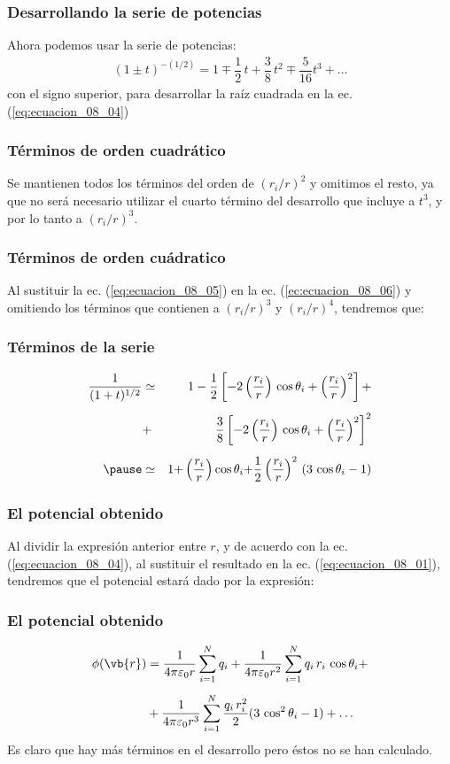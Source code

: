 \begin{frame}
\frametitle{Desarrollando la serie de potencias}
Ahora podemos usar la serie de potencias:
\begin{align}
(1 \pm t)^{-(1/2)} = 1 \mp \dfrac{1}{2} \, t + \dfrac{3}{8} \, t^{2} \mp \dfrac{5}{16} t^{3} + \ldots
\label{ec:ecuacion_08_06}
\end{align}
con el signo superior, para desarrollar la raíz cuadrada en la ec. (\ref{eq:ecuacion_08_04})
\end{frame}
\begin{frame}
\frametitle{Términos de orden cuadrático}
Se mantienen todos los términos del orden de $(r_{i}/r)^{2}$ y omitimos el resto, ya que no será necesario utilizar el cuarto término del desarrollo que incluye a $t^{3}$, y por lo tanto a $(r_{i}/r)^{3}$.
\end{frame}
\begin{frame}
\frametitle{Términos de orden cuádratico}
Al sustituir la ec. (\ref{eq:ecuacion_08_05}) en la ec. (\ref{ec:ecuacion_08_06}) y omitiendo los términos que contienen a $(r_{i}/r)^{3}$ y $(r_{i}/r)^{4}$, tendremos que:
\end{frame}
\begin{frame}
\frametitle{Términos de la serie}
\begin{eqnarray*}
\dfrac{1}{(1 + t)^{1/2}} &\simeq& 1 - \dfrac{1}{2} \left[ -2 \left( \dfrac{r_{i}}{r} \right) \, \cos \theta_{i} + \left( \dfrac{r_{i}}{r} \right)^{2} \right] + \\[0.5em]
&+& \dfrac{3}{8} \left[ -2 \left( \dfrac{r_{i}}{r} \right) \, \cos \theta_{i} + \left( \dfrac{r_{i}}{r} \right)^{2} \right]^{2} \\[0.5em] \pause
&\simeq& 1 {+} \left( \dfrac{r_{i}}{r} \right) \cos \theta_{i} {+} \dfrac{1}{2} \left( \dfrac{r_{i}}{r} \right)^{2} \, (3 \, \cos \theta_{i} - 1)
\end{eqnarray*}
\end{frame}
\begin{frame}
\frametitle{El potencial obtenido}
Al dividir la expresión anterior entre $r$, y de acuerdo con la ec. (\ref{eq:ecuacion_08_04}), al sustituir el resultado en la ec. (\ref{eq:ecuacion_08_01}), tendremos que el potencial estará dado por la expresión:
\end{frame}
\begin{frame}
\frametitle{El potencial obtenido}
\begin{align}
\begin{aligned}[b]
\phi(\vb{r}) &= \dfrac{1}{4 \pi \varepsilon_{0} r} \sum_{i=1}^{N} q_{i} + \dfrac{1}{4 \pi \varepsilon_{0} r^{2}} \sum_{i=1}^{N} q_{i} \, r_{i} \, \cos \theta_{i} + \\[0.5em]
&+ \dfrac{1}{4 \pi \varepsilon_{0} r^{3}} \sum_{i=1}^{N} \dfrac{q_{i} \, r_{i}^{2}}{2} (3 \, \cos^{2} \theta_{i} - 1) + \ldots
\end{aligned}
\label{eq:ecuacion_08_07}
\end{align}
\pause
Es claro que hay más términos en el desarrollo pero éstos no se han calculado.
\end{frame}
